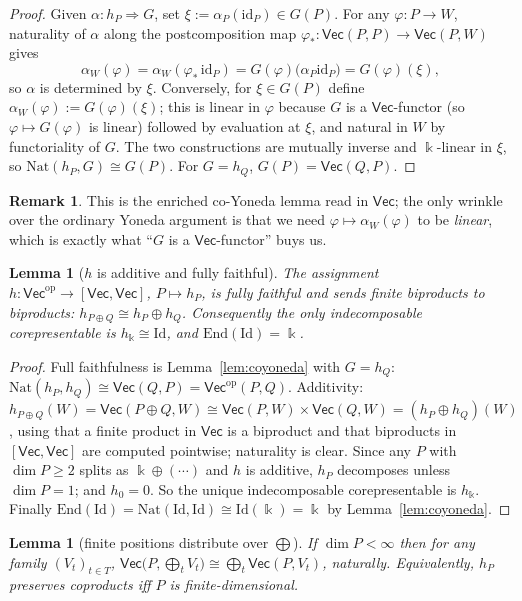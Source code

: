 \documentclass[11pt]{amsart}
\theoremstyle{plain}
\newtheorem{lemma}[theorem]{Lemma}
\theoremstyle{definition}
\newtheorem{remark}[theorem]{Remark}
\renewcommand{\Vec}{\mathsf{Vec}}
\newcommand{\op}{\mathrm{op}}
\newcommand{\Nat}{\mathrm{Nat}}
\newcommand{\End}{\mathrm{End}}
\newcommand{\id}{\mathrm{id}}
\newcommand{\Id}{\mathrm{Id}}
\newcommand{\fld}{\Bbbk}
\newcommand{\iso}{\cong}
\begin{document}
\begin{proof}
Given $\alpha\colon h_P\Rightarrow G$, set $\xi:=\alpha_P(\id_P)\in G(P)$. For
any $\varphi\colon P\to W$, naturality of $\alpha$ along the postcomposition map
$\varphi_*\colon\Vec(P,P)\to\Vec(P,W)$ gives
\[
  \alpha_W(\varphi)=\alpha_W(\varphi_*\,\id_P)=G(\varphi)\bigl(\alpha_P\id_P\bigr)
  = G(\varphi)(\xi),
\]
so $\alpha$ is determined by $\xi$. Conversely, for $\xi\in G(P)$ define
$\alpha_W(\varphi):=G(\varphi)(\xi)$; this is linear in $\varphi$ because $G$ is
a $\Vec$-functor (so $\varphi\mapsto G(\varphi)$ is linear) followed by
evaluation at $\xi$, and natural in $W$ by functoriality of $G$. The two
constructions are mutually inverse and $\fld$-linear in $\xi$, so
$\Nat(h_P,G)\iso G(P)$. For $G=h_Q$, $G(P)=\Vec(Q,P)$.
\end{proof}

\begin{remark}
This is the enriched co-Yoneda lemma read in $\Vec$; the only wrinkle over the
ordinary Yoneda argument is that we need $\varphi\mapsto\alpha_W(\varphi)$ to be
\emph{linear}, which is exactly what ``$G$ is a $\Vec$-functor'' buys us.
\end{remark}

\begin{lemma}[$h$ is additive and fully faithful]\label{lem:h}
The assignment $h\colon\Vec^\op\to[\Vec,\Vec]$, $P\mapsto h_P$, is fully
faithful and sends finite biproducts to biproducts:
$h_{P\oplus Q}\iso h_P\oplus h_Q$. Consequently the only indecomposable
corepresentable is $h_\fld\iso\Id$, and $\End(\Id)=\fld$.
\end{lemma}

\begin{proof}
Full faithfulness is Lemma~\ref{lem:coyoneda} with $G=h_Q$:
$\Nat(h_P,h_Q)\iso\Vec(Q,P)=\Vec^\op(P,Q)$. Additivity:
$h_{P\oplus Q}(W)=\Vec(P\oplus Q,W)\iso\Vec(P,W)\times\Vec(Q,W)=(h_P\oplus
h_Q)(W)$, using that a finite product in $\Vec$ is a biproduct and that
biproducts in $[\Vec,\Vec]$ are computed pointwise; naturality is clear. Since
any $P$ with $\dim P\ge 2$ splits as $\fld\oplus(\cdots)$ and $h$ is additive,
$h_P$ decomposes unless $\dim P=1$; and $h_0=0$. So the unique indecomposable
corepresentable is $h_\fld$. Finally $\End(\Id)=\Nat(\Id,\Id)\iso\Id(\fld)=\fld$ by
Lemma~\ref{lem:coyoneda}.
\end{proof}

\begin{lemma}[finite positions distribute over $\bigoplus$]\label{lem:distribute}
If $\dim P<\infty$ then for any family $(V_t)_{t\in T}$,
$\Vec\bigl(P,\bigoplus_t V_t\bigr)\iso\bigoplus_t\Vec(P,V_t)$, naturally.
Equivalently, $h_P$ preserves coproducts iff $P$ is finite-dimensional.
\end{lemma}
\end{document}
